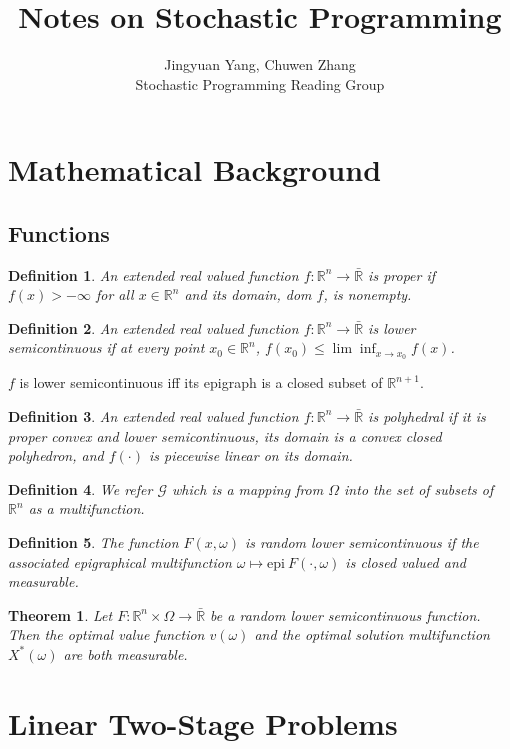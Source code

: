 \documentclass[a4pper,11pt]{article}
\title{Notes on Stochastic Programming}
\author{Jingyuan Yang, Chuwen Zhang\\ Stochastic Programming Reading Group}
\newtheorem{thm}{Theorem}[section]
\newtheorem{defn}{Definition}[section]
\begin{document}
\maketitle

\section{Mathematical Background}
\subsection{Functions}
\begin{defn}
An extended real valued function $f: \mathbb R^n \to \bar {\mathbb R}$ is \textit{proper} if $f(x)>-\infty$ for all $x\in \mathbb R^n$ and its domain, dom $f$, is nonempty.
\end{defn}
\begin{defn}
An extended real valued function $f: \mathbb R^n \to \bar {\mathbb R}$ is lower semicontinuous if at every point $x_0\in \mathbb R^n$, $f(x_0)\leq \lim \inf_{x\to x_0} f(x)$.
\end{defn}
$f$ is lower semicontinuous iff its epigraph is a closed subset of $\mathbb R^{n+1}$.
\begin{defn}
An extended real valued function $f: \mathbb R^n \to \bar {\mathbb R}$ is polyhedral if it is proper convex and lower semicontinuous, its domain is a convex closed polyhedron, and $f(\cdot)$ is piecewise linear on its domain.
\end{defn}
\begin{defn}
We refer $\mathscr G$ which is a mapping from $\Omega$ into the set of subsets of $\mathbb R^n$ as a multifunction.
\end{defn}
\begin{defn}
The function $F(x,\omega)$ is random lower semicontinuous if the associated epigraphical multifunction $\omega \mapsto \text{epi} \ F(\cdot,\omega)$ is closed valued and measurable.
\end{defn}
\begin{thm}
\label{thm-1}
Let $F: \mathbb R^n \times \Omega \to \bar {\mathbb R}$ be a random lower semicontinuous function. Then the optimal value function $v(\omega)$ and the optimal solution multifunction $X^*(\omega)$ are both measurable.
\end{thm}
\section{Linear Two-Stage Problems}
\end{document}
